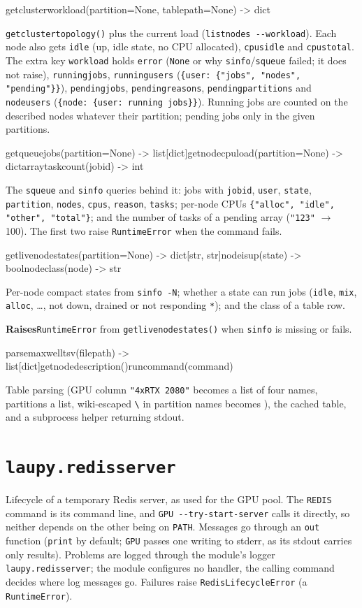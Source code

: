 \documentclass[11pt,a4paper]{article}
\newcommand{\api}[1]{%
  \par\medskip
  \begin{tcolorbox}[colback=sigbg, colframe=sigbg, boxrule=0pt, arc=1pt, left=4pt, right=4pt, top=2pt, bottom=2pt, breakable]
  \raggedright\ttfamily\small #1
  \end{tcolorbox}\nopagebreak\vspace{-4pt}%
}
\DeclareRobustCommand{\_}{\textunderscore\allowbreak}
\newcommand{\cmd}[1]{\texttt{#1}}
\newcommand{\raises}{\par\textsf{\small\bfseries Raises}\quad}
\begin{document}
\api{get\_cluster\_workload(partition=None, table\_path=None) -> dict}
\cmd{get\_cluster\_topology()} plus the current load (\cmd{listnodes -{}-workload}). Each node also
gets \cmd{idle} (up, idle state, no CPU allocated), \cmd{cpus\_idle} and \cmd{cpus\_total}. The extra
key \cmd{workload} holds \cmd{error} (\cmd{None} or why \cmd{sinfo}/\cmd{squeue} failed; it does not
raise), \cmd{running\_jobs}, \cmd{running\_users} (\cmd{\{user: \{"jobs", "nodes", "pending"\}\}}),
\cmd{pending\_jobs}, \cmd{pending\_reasons}, \cmd{pending\_partitions} and \cmd{node\_users}
(\cmd{\{node: \{user: running jobs\}\}}). Running jobs are counted on the described nodes whatever
their partition; pending jobs only in the given partitions.

\api{get\_queue\_jobs(partition=None) -> list[dict]\quad get\_node\_cpu\_load(partition=None) -> dict\quad array\_task\_count(job\_id) -> int}
The \cmd{squeue} and \cmd{sinfo} queries behind it: jobs with \cmd{job\_id}, \cmd{user},
\cmd{state}, \cmd{partition}, \cmd{nodes}, \cmd{cpus}, \cmd{reason}, \cmd{tasks}; per-node CPUs
\cmd{\{"alloc", "idle", "other", "total"\}}; and the number of tasks of a pending array
(\cmd{"123\_[1-100\%10]"} $\rightarrow$ 100). The first two raise \cmd{RuntimeError} when the
command fails.

\api{get\_live\_node\_states(partition=None) -> dict[str, str]\quad node\_is\_up(state) -> bool\quad node\_class(node) -> str}
Per-node compact states from \cmd{sinfo -N}; whether a state can run jobs (\cmd{idle}, \cmd{mix},
\cmd{alloc}, \ldots, not down, drained or not responding \cmd{*}); and the class of a table row.
\raises \cmd{RuntimeError} from \cmd{get\_live\_node\_states()} when \cmd{sinfo} is missing or fails.

\api{parse\_maxwell\_tsv(file\_path) -> list[dict]\quad get\_node\_description()\quad run\_command(command)}
Table parsing (GPU column \cmd{"4xRTX 2080"} becomes a list of four names, partitions a list,
wiki-escaped \cmd{\textbackslash\_} in partition names becomes \cmd{\_}), the
cached table, and a subprocess helper returning stdout.

\section{\texorpdfstring{\cmd{laupy.redis\_server}}{laupy.redis\_server}}

Lifecycle of a temporary Redis server, as used for the GPU pool. The \cmd{REDIS} command is its
command line, and \cmd{GPU -{}-try-start-server} calls it directly, so neither depends on the other
being on \cmd{PATH}. Messages go through an \cmd{out} function (\cmd{print} by default; \cmd{GPU}
passes one writing to stderr, as its stdout carries only results). Problems are logged through the
module's logger \cmd{laupy.redis\_server}; the module configures no handler, the calling command
decides where log messages go. Failures raise \cmd{RedisLifecycleError} (a \cmd{RuntimeError}).
\end{document}
